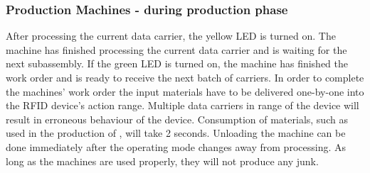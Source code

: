 \documentclass[12pt,twoside]{article}
\begin{document}
\subsubsection{Production Machines - during production phase}
After processing the current data carrier, the yellow LED is turned
on.  The machine has finished processing the current data carrier and
is waiting for the next subassembly. If the green LED is turned on,
the machine has finished the work order and is ready to receive the
next batch of carriers. In order to complete the machines' work order
the input materials have to be delivered one-by-one into the RFID
device's action range. Multiple data carriers in range of the device
will result in erroneous behaviour of the device. Consumption of
materials, such as  used in the production of , will take 2
seconds. Unloading the machine can be done immediately after the
operating mode changes away from processing. As long as the machines
are used properly, they will not produce any junk.
\end{document}
